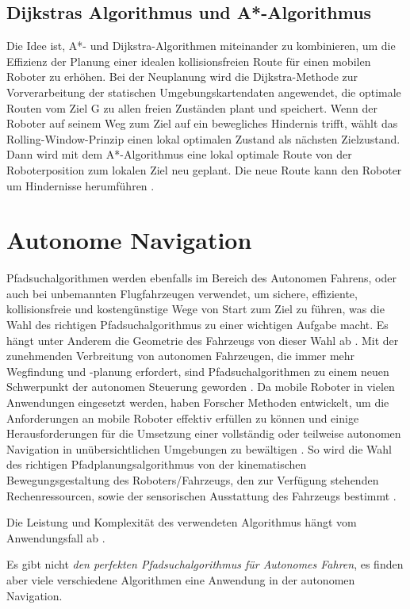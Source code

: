 \subsection{Dijkstras Algorithmus und A*-Algorithmus}

Die Idee ist, A*- und Dijkstra-Algorithmen miteinander zu kombinieren, um die Effizienz der Planung einer idealen kollisionsfreien Route für einen mobilen Roboter zu erhöhen. Bei der Neuplanung wird die Dijkstra-Methode zur Vorverarbeitung der statischen Umgebungskartendaten angewendet, die optimale Routen vom Ziel G zu allen freien Zuständen plant und speichert. Wenn der Roboter auf seinem Weg zum Ziel auf ein bewegliches Hindernis trifft, wählt das Rolling-Window-Prinzip einen lokal optimalen Zustand als nächsten Zielzustand. Dann wird mit dem A*-Algorithmus eine lokal optimale Route von der Roboterposition zum lokalen Ziel neu geplant.
Die neue Route kann den Roboter um Hindernisse herumführen \cite{Hong-mei17}.



\section{Autonome Navigation}
\label{Autonome Navigation}

Pfadsuchalgorithmen werden ebenfalls im Bereich des Autonomen Fahrens, oder auch bei unbemannten Flugfahrzeugen verwendet,
um sichere, effiziente, kollisionsfreie und kostengünstige Wege von Start zum Ziel zu führen, was die Wahl des richtigen Pfadsuchalgorithmus
zu einer wichtigen Aufgabe macht. Es hängt unter Anderem die Geometrie des Fahrzeugs von dieser Wahl ab \cite{Karur:21}.
Mit der zunehmenden Verbreitung von autonomen Fahrzeugen, die immer mehr Wegfindung und -planung erfordert, sind Pfadsuchalgorithmen
zu einem neuen Schwerpunkt der autonomen Steuerung geworden \cite{Karur:21}.
Da mobile Roboter in vielen Anwendungen eingesetzt werden, haben Forscher Methoden entwickelt, um die 
Anforderungen an mobile Roboter effektiv erfüllen zu können und einige Herausforderungen für die Umsetzung einer vollständig oder
teilweise autonomen Navigation in unübersichtlichen Umgebungen zu bewältigen \cite{Karur:21}.
So wird die Wahl des richtigen Pfadplanungsalgorithmus von der kinematischen Bewegungsgestaltung des Roboters/Fahrzeugs,
den zur Verfügung stehenden Rechenressourcen, sowie der sensorischen Ausstattung des Fahrzeugs bestimmt \cite{Karur:21}.

Die Leistung und Komplexität des verwendeten Algorithmus hängt vom Anwendungsfall ab \cite{Karur:21}.

Es gibt nicht \emph{den perfekten Pfadsuchalgorithmus für Autonomes Fahren}, es finden aber viele verschiedene Algorithmen eine 
Anwendung in der autonomen Navigation.